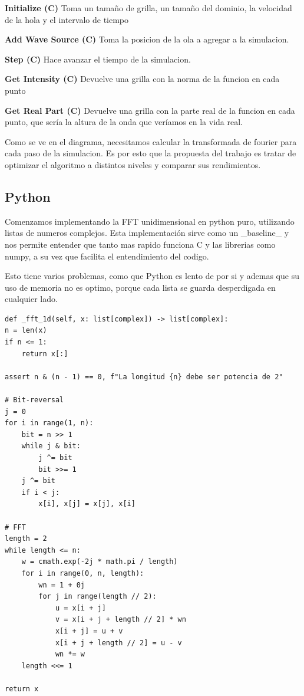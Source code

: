 \documentclass[a4paper]{article}
\begin{document}
\textbf{Initialize (C)}
Toma un tamaño de grilla, un tamaño del dominio, la velocidad de la hola y el intervalo de tiempo

\textbf{Add Wave Source (C)}
Toma la posicion de la ola a agregar a la simulacion.

\textbf{Step (C)}
Hace avanzar el tiempo de la simulacion.

\textbf{Get Intensity (C)}
Devuelve una grilla con la norma de la funcion en cada punto

\textbf{Get Real Part (C)}
Devuelve una grilla con la parte real de la funcion en cada punto, que sería la altura de la onda que veríamos en la vida real.

Como se ve en el diagrama, necesitamos calcular la transformada de fourier para cada paso de la simulacion. Es por esto que la
propuesta del trabajo es tratar de optimizar el algoritmo a distintos niveles y comparar sus rendimientos.

\subsection{Python}
Comenzamos implementando la FFT unidimensional en python puro, utilizando listas de numeros complejos. Esta implementación sirve
como un _baseline_ y nos permite entender que tanto mas rapido funciona C y las librerias como numpy, a su vez que facilita
el entendimiento del codigo.

Esto tiene varios problemas, como que Python es lento de por si y ademas que su uso de memoria no es optimo, porque cada lista se
guarda desperdigada en cualquier lado.

\begin{verbatim}
def _fft_1d(self, x: list[complex]) -> list[complex]:
n = len(x)
if n <= 1:
    return x[:]

assert n & (n - 1) == 0, f"La longitud {n} debe ser potencia de 2"

# Bit-reversal
j = 0
for i in range(1, n):
    bit = n >> 1
    while j & bit:
        j ^= bit
        bit >>= 1
    j ^= bit
    if i < j:
        x[i], x[j] = x[j], x[i]

# FFT
length = 2
while length <= n:
    w = cmath.exp(-2j * math.pi / length)
    for i in range(0, n, length):
        wn = 1 + 0j
        for j in range(length // 2):
            u = x[i + j]
            v = x[i + j + length // 2] * wn
            x[i + j] = u + v
            x[i + j + length // 2] = u - v
            wn *= w
    length <<= 1

return x
\end{verbatim}
\end{document}
